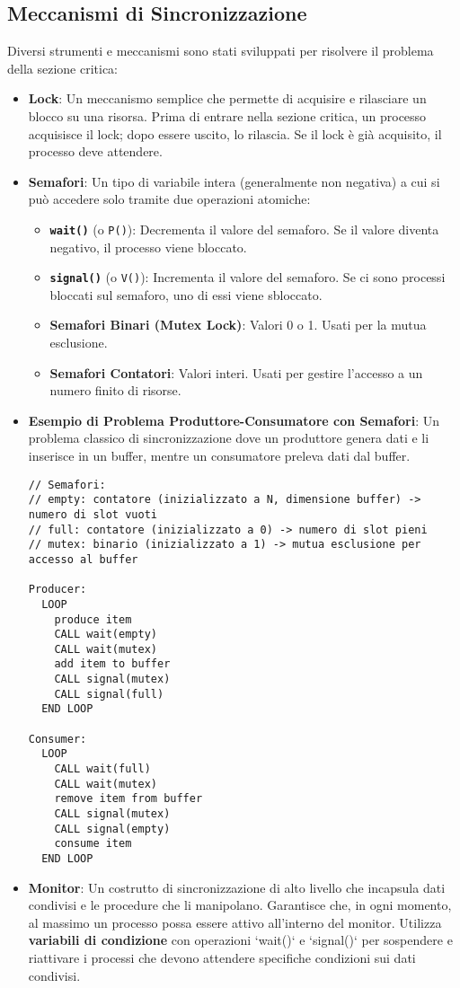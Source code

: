 \subsection{Meccanismi di Sincronizzazione}
Diversi strumenti e meccanismi sono stati sviluppati per risolvere il problema della sezione critica:
\begin{itemize}
    \item \textbf{Lock}: Un meccanismo semplice che permette di acquisire e rilasciare un blocco su una risorsa. Prima di entrare nella sezione critica, un processo acquisisce il lock; dopo essere uscito, lo rilascia. Se il lock è già acquisito, il processo deve attendere.
    \item \textbf{Semafori}: Un tipo di variabile intera (generalmente non negativa) a cui si può accedere solo tramite due operazioni atomiche:
    \begin{itemize}
        \item \textbf{\lstinline{wait()}} (o \lstinline{P()}): Decrementa il valore del semaforo. Se il valore diventa negativo, il processo viene bloccato.
        \item \textbf{\lstinline{signal()}} (o \lstinline{V()}): Incrementa il valore del semaforo. Se ci sono processi bloccati sul semaforo, uno di essi viene sbloccato.
        \item \textbf{Semafori Binari (Mutex Lock)}: Valori 0 o 1. Usati per la mutua esclusione.
        \item \textbf{Semafori Contatori}: Valori interi. Usati per gestire l'accesso a un numero finito di risorse.
    \end{itemize}
    \item \textbf{Esempio di Problema Produttore-Consumatore con Semafori}:
    Un problema classico di sincronizzazione dove un produttore genera dati e li inserisce in un buffer, mentre un consumatore preleva dati dal buffer.
    \begin{lstlisting}[language=Pseudocode, numbers=none]
// Semafori:
// empty: contatore (inizializzato a N, dimensione buffer) -> numero di slot vuoti
// full: contatore (inizializzato a 0) -> numero di slot pieni
// mutex: binario (inizializzato a 1) -> mutua esclusione per accesso al buffer

Producer:
  LOOP
    produce item
    CALL wait(empty)
    CALL wait(mutex)
    add item to buffer
    CALL signal(mutex)
    CALL signal(full)
  END LOOP

Consumer:
  LOOP
    CALL wait(full)
    CALL wait(mutex)
    remove item from buffer
    CALL signal(mutex)
    CALL signal(empty)
    consume item
  END LOOP
    \end{lstlisting}
    \item \textbf{Monitor}: Un costrutto di sincronizzazione di alto livello che incapsula dati condivisi e le procedure che li manipolano. Garantisce che, in ogni momento, al massimo un processo possa essere attivo all'interno del monitor. Utilizza \textbf{variabili di condizione} con operazioni `wait()` e `signal()` per sospendere e riattivare i processi che devono attendere specifiche condizioni sui dati condivisi.
\end{itemize}

